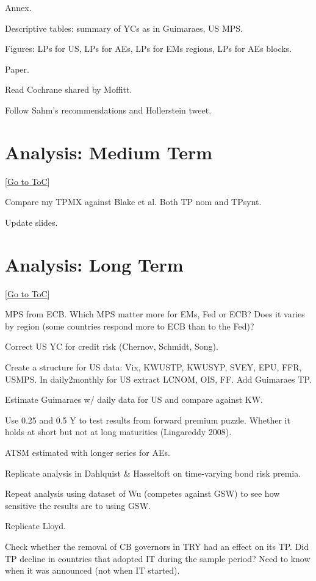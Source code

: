 \documentclass[12pt]{article}
\newcommand{\gototoc}{\vspace{-1.8cm} \null\hfill [\hyperlink{toc}{Go to ToC}] \newline}
\begin{document}
\begin{todolist}
	\item Annex.
	\begin{todolist}
		\item Descriptive tables: summary of YCs as in Guimaraes, US MPS.
		\item Figures: LPs for US, LPs for AEs, LPs for EMs regions, LPs for AEs blocks.
	\end{todolist}
	
	\item Paper.
	\begin{todolist}
		\item Read Cochrane shared by Moffitt.
		\item Follow Sahm's recommendations and Hollerstein tweet.
	\end{todolist}
	
\end{todolist}

\section{Analysis: Medium Term}
\gototoc
\begin{todolist}
	\item Compare my TPMX against Blake et al. Both TP nom and TPsynt.
	\item Update slides.
\end{todolist}

\section{Analysis: Long Term}
\gototoc
\begin{todolist}
	\item MPS from ECB. Which MPS matter more for EMs, Fed or ECB? Does it varies by region (some countries respond more to ECB than to the Fed)?
	\item Correct US YC for credit risk (Chernov, Schmidt, Song).
	\item Create a structure for US data: Vix, KWUSTP, KWUSYP, SVEY, EPU, FFR, USMPS. In daily2monthly for US extract LCNOM, OIS, FF. Add Guimaraes TP.
	\item Estimate Guimaraes w/ daily data for US and compare against KW.
	\item Use 0.25 and 0.5 Y to test results from forward premium puzzle. Whether it holds at short but not at long maturities (Lingareddy 2008).
	\item ATSM estimated with longer series for AEs.
	\item Replicate analysis in Dahlquist \& Hasseltoft on time-varying bond risk premia.
	\item Repeat analysis using dataset of Wu (competes against GSW) to see how sensitive the results are to using GSW.
	\item Replicate Lloyd.
	\item Check whether the removal of CB governors in TRY had an effect on its TP. Did TP decline in countries that adopted IT during the sample period? Need to know when it was announced (not when IT started).
\end{todolist}
\end{document}
